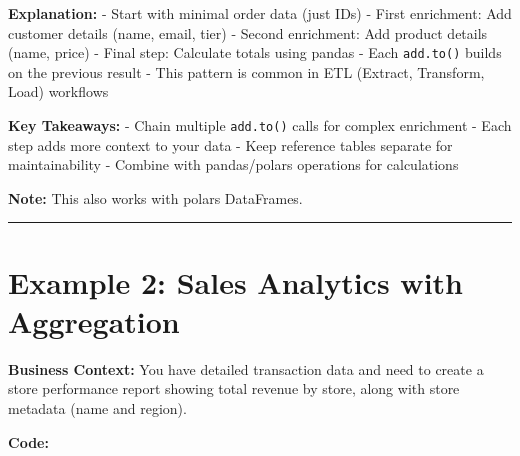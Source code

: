 \documentclass[
  letterpaper,
]{scrbook}
\begin{document}
\textbf{Explanation:} - Start with minimal order data (just IDs) - First
enrichment: Add customer details (name, email, tier) - Second
enrichment: Add product details (name, price) - Final step: Calculate
totals using pandas - Each \texttt{add.to()} builds on the previous
result - This pattern is common in ETL (Extract, Transform, Load)
workflows

\textbf{Key Takeaways:} - Chain multiple \texttt{add.to()} calls for
complex enrichment - Each step adds more context to your data - Keep
reference tables separate for maintainability - Combine with
pandas/polars operations for calculations

\textbf{Note:} This also works with polars DataFrames.

\begin{center}\rule{0.5\linewidth}{0.5pt}\end{center}

\section{Example 2: Sales Analytics with
Aggregation}\label{example-2-sales-analytics-with-aggregation}

\textbf{Business Context:} You have detailed transaction data and need
to create a store performance report showing total revenue by store,
along with store metadata (name and region).

\textbf{Code:}
\end{document}
